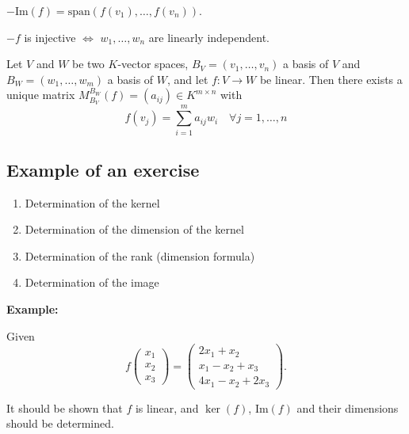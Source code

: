 \(- \text{Im}(f) = \text{span}(f(v_1), \dots, f(v_n))\).

\(- f\) is injective \(\Leftrightarrow\) \(w_1, \dots, w_n\) are linearly independent.

Let \(V\) and \(W\) be two \(K\)-vector spaces, \(B_V = (v_1, \dots, v_n)\) a basis of \(V\) and \(B_W = (w_1, \dots, w_m)\) a basis of \(W\), and let \(f : V \rightarrow W\) be linear. Then there exists a unique matrix \(M_{B_V}^{B_W}(f) = (a_{ij}) \in K^{m \times n}\) with
\[
f(v_j) = \sum_{i=1}^{m} a_{ij}w_i \quad \forall j = 1, \dots, n
\]

\subsection{Example of an exercise}

\begin{enumerate}
    \item Determination of the kernel
    \item Determination of the dimension of the kernel
    \item Determination of the rank (dimension formula)
    \item Determination of the image
\end{enumerate}


\textbf{Example:}
\vspace{\baselineskip}
 

Given
\[
f\begin{pmatrix}
x_1 \\
x_2 \\
x_3
\end{pmatrix} =
\begin{pmatrix}
2x_1 + x_2 \\
x_1 - x_2 + x_3 \\
4x_1 - x_2 + 2x_3
\end{pmatrix} .
\]

It should be shown that \(f\) is linear, and \(\ker(f)\), \(\text{Im}(f)\) and their dimensions should be determined.

